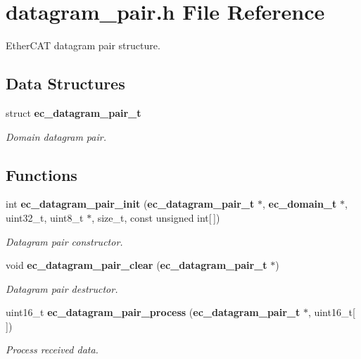 \section{datagram\-\_\-pair.\-h \-File \-Reference}
\label{datagram__pair_8h}


\-Ether\-C\-A\-T datagram pair structure.  


\subsection*{\-Data \-Structures}
\begin{DoxyCompactItemize}
\item 
struct {\bf ec\-\_\-datagram\-\_\-pair\-\_\-t}
\begin{DoxyCompactList}\small\item\em \-Domain datagram pair. \end{DoxyCompactList}\end{DoxyCompactItemize}
\subsection*{\-Functions}
\begin{DoxyCompactItemize}
\item 
int {\bf ec\-\_\-datagram\-\_\-pair\-\_\-init} ({\bf ec\-\_\-datagram\-\_\-pair\-\_\-t} $\ast$, {\bf ec\-\_\-domain\-\_\-t} $\ast$, uint32\-\_\-t, uint8\-\_\-t $\ast$, size\-\_\-t, const unsigned int[$\,$])
\begin{DoxyCompactList}\small\item\em \-Datagram pair constructor. \end{DoxyCompactList}\item 
void {\bf ec\-\_\-datagram\-\_\-pair\-\_\-clear} ({\bf ec\-\_\-datagram\-\_\-pair\-\_\-t} $\ast$)\label{datagram__pair_8h_ac3ff7374f362ab7e2990346186202b71}

\begin{DoxyCompactList}\small\item\em \-Datagram pair destructor. \end{DoxyCompactList}\item 
uint16\-\_\-t {\bf ec\-\_\-datagram\-\_\-pair\-\_\-process} ({\bf ec\-\_\-datagram\-\_\-pair\-\_\-t} $\ast$, uint16\-\_\-t[$\,$])
\begin{DoxyCompactList}\small\item\em \-Process received data. \end{DoxyCompactList}\end{DoxyCompactItemize}


